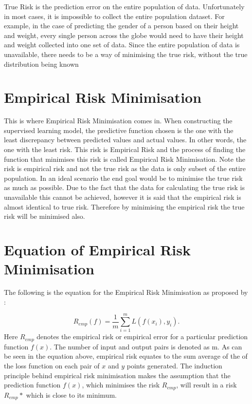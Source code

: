 True Risk is the prediction error on the entire population of data. Unfortunately in most cases, it is impossible to collect the entire population dataset. For example, in the case of predicting the gender of a person based on their height and weight, every single person across the globe would need to have their height and weight collected into one set of data. Since the entire population of data is unavailable, there needs to be a way of minimising the true risk, without the true distribution being known \citep{principles}

\section{Empirical Risk Minimisation}
This is where Empirical Risk Minimisation comes in. When constructing the supervised learning model, the predictive function chosen is the one with the least discrepancy between predicted values and actual values. In other words, the one with the least risk. This risk is Empirical Risk and the process of finding the function that minimises this risk is called Empirical Risk Minimisation. Note the risk is empirical risk and not the true risk as the data is only subset of the entire population. In an ideal scenario the end goal would be to minimise the true risk as much as possible. Due to the fact that the data for calculating the true risk is unavailable this cannot be achieved, however it is said that the empirical risk is almost identical to true risk. Therefore by minimising the empirical risk the true risk will be minimised also.

\section{Equation of Empirical Risk Minimisation}

The following is the equation for the Empirical Risk Minimisation as proposed by \citet{Vapnik}:

\begin{equation}
    R_{emp}(f) = \frac{1}{m} \sum_{i=1}^{m} L(f(x_{i})   ,y_{i}).
\end{equation}
Here $R_{emp}$ denotes the empirical risk or empirical error for a particular prediction function $f(x)$. The number of input and output pairs is denoted as m. As can be seen in the equation above, empirical risk equates to the sum average of the of the loss function on each pair of $x$ and $y$ points generated. The induction principle behind empirical risk minimisation makes the assumption that the prediction function $f(x)$, which minimises the risk $R_{emp}$, will result in a risk $R_{emp}*$ which is close to its minimum. 

